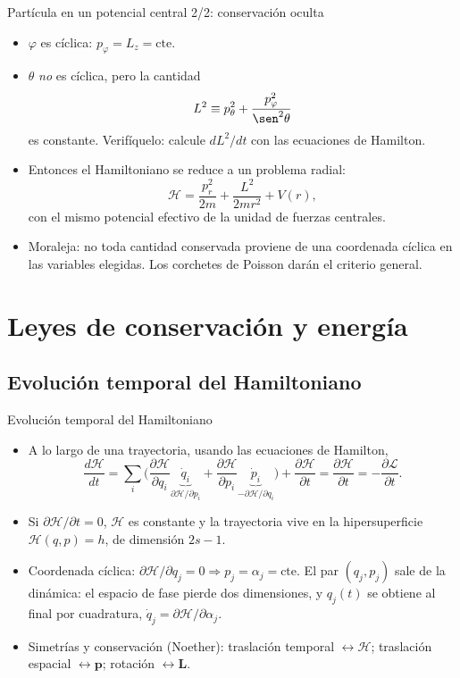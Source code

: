 \documentclass[spanish]{beamer}
\newcommand{\Lag}{\mathcal{L}}               %
\newcommand{\Ham}{\mathcal{H}}               %
\newcommand{\pd}[2]{\frac{\partial #1}{\partial #2}}
\newcommand{\cte}{\text{cte}}
\begin{document}
\begin{frame}{Partícula en un potencial central 2/2: conservación oculta}
\begin{itemize}[<+->]
  \item $\varphi$ es cíclica: $p_\varphi=L_z=\cte$.
  \item $\theta$ \emph{no} es cíclica, pero la cantidad
        \[
          L^2\equiv p_\theta^2+\frac{p_\varphi^2}{\sen^2\theta}
        \]
        es constante. Verifíquelo: calcule $dL^2/dt$ con las ecuaciones de Hamilton.
  \item Entonces el Hamiltoniano se reduce a un problema radial:
        \[
          \Ham=\frac{p_r^2}{2m}+\frac{L^2}{2mr^2}+V(r),
        \]
        con el mismo potencial efectivo de la unidad de fuerzas centrales.
  \item Moraleja: no toda cantidad conservada proviene de una coordenada cíclica en las
        variables elegidas. Los corchetes de Poisson darán el criterio general.
\end{itemize}
\end{frame}

\section{Leyes de conservación y energía}

\subsection{Evolución temporal del Hamiltoniano}
\begin{frame}{Evolución temporal del Hamiltoniano}
\begin{itemize}[<+->]
  \item A lo largo de una trayectoria, usando las ecuaciones de Hamilton,
        \[
          \frac{d\Ham}{dt}
          =\sum_i\Big(\pd{\Ham}{q_i}\underbrace{\dot q_i}_{\partial\Ham/\partial p_i}
          +\pd{\Ham}{p_i}\underbrace{\dot p_i}_{-\partial\Ham/\partial q_i}\Big)
          +\pd{\Ham}{t}
          =\pd{\Ham}{t}=-\pd{\Lag}{t}.
        \]
  \item Si $\partial\Ham/\partial t=0$, $\Ham$ es constante y la trayectoria vive en la
        hipersuperficie $\Ham(q,p)=h$, de dimensión $2s-1$.
  \item Coordenada cíclica: $\partial\Ham/\partial q_j=0\Rightarrow p_j=\alpha_j=\cte$.
        El par $(q_j,p_j)$ sale de la dinámica: el espacio de fase pierde dos dimensiones,
        y $q_j(t)$ se obtiene al final por cuadratura,
        $\dot q_j=\partial\Ham/\partial\alpha_j$.
  \item Simetrías y conservación (Noether): traslación temporal $\leftrightarrow\Ham$;
        traslación espacial $\leftrightarrow\mathbf p$; rotación $\leftrightarrow\mathbf L$.
\end{itemize}
\end{frame}
\end{document}
